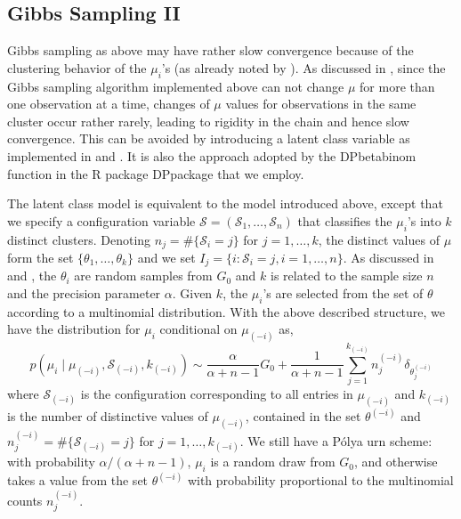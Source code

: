 \documentclass[12pt]{amsart}
\begin{document}
{\subsection{Gibbs Sampling II}
Gibbs sampling as above may have rather slow convergence because of the clustering behavior of 
the $\mu_{i}$'s (as already noted by ). As discussed in , 
since the Gibbs sampling algorithm implemented above can not change $\mu$ for more than one 
observation at a time, changes of $\mu$ values for observations in the same cluster occur 
rather rarely, leading to rigidity in the chain and hence slow convergence. 
This can be avoided by introducing a latent class variable as implemented in 
 and . It is also the approach adopted by the 
DPbetabinom function in the  R package DPpackage that we employ.

The latent class model is equivalent to the model introduced above, except that we 
specify a configuration variable $\mathcal{S}=(\mathcal{S}_{1}, \dots, \mathcal{S}_{n})$ 
that classifies the $\mu_{i}$'s into $k$ distinct clusters. 
Denoting $n_{j}= \# \{ \mathcal{S}_{i} =j \}$ for $j = 1, \dots, k$, the distinct values of 
$\mu$ form the set $\{ \theta_{1}, \dots, \theta_{k} \}$ and we set
$I_{j} = \{ i: \mathcal{S}_{i}=j, i=1, \dots, n\}$. 
As discussed in  and , the $\theta_{i}$ are 
random samples from $G_{0}$ and $k$ is related to the sample size $n$ and the precision 
parameter $\alpha$. Given $k$, the $\mu_{i}$'s are selected from the set of $\theta$ 
according to a multinomial distribution. With the above described structure, we have 
the distribution for $\mu_{i}$ conditional on $\mu_{(-i)}$ as, 
\[
p(\mu_{i} \mid \mu_{(-i)}, \mathcal{S}_{(-i)},  k_{(-i)}) \sim \frac{\alpha}{\alpha+n-1} G_{0} + \frac{1}{\alpha+n-1} \sum_{j=1}^{k_{(-i)}}  n_{j}^{(-i)} \delta_{\theta_{j}^{(-i)}}
\]
where $\mathcal{S}_{(-i)}$ is the configuration corresponding to all entries in 
$\mu_{(-i)}$ and $k_{(-i)}$ is the number of distinctive values of $\mu_{(-i)}$, 
contained in the set $\theta^{(-i)}$ and $n_{j}^{(-i)} = \# \{ \mathcal{S}_{(-i)} = j \}$ 
for $j = 1, \dots, k_{(-i)}$. We still have a P\'olya urn scheme:  with probability 
$\alpha/(\alpha+n-1)$, $\mu_{i}$ is a random draw from $G_{0}$, and otherwise takes a value 
from the set $\theta^{(-i)}$ with probability proportional to the multinomial counts 
$n_{j}^{(-i)}$. 

}
\end{document}
